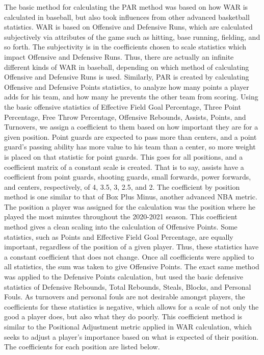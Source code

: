 \documentclass[12pt]{article}
\begin{document}
The basic method for calculating the PAR method was based on how WAR is calculated in baseball, but 
also took influences from other advanced basketball statistics. WAR is based on Offensive and Defensive 
Runs, which are calculated subjectively via attributes of the game such as hitting, base running, fielding, 
and so forth. The subjectivity is in the coefficients chosen to scale statistics which impact Offensive and 
Defensive Runs. Thus, there are actually an infinite different kinds of WAR in baseball, depending on which 
method of calculating Offensive and Defensive Runs is used. Similarly, PAR is created by calculating 
Offensive and Defensive Points statistics, to analyze how many points a player adds for his team, and how 
many he prevents the other team from scoring. Using the basic offensive statistics of Effective Field Goal 
Percentage, Three Point Percentage, Free Throw Percentage, Offensive Rebounds, Assists, Points, and 
Turnovers, we assign a coefficient to them based on how important they are for a given position. Point 
guards are expected to pass more than centers, and a point guard's passing ability has more value to his 
team than a center, so more weight is placed on that statistic for point guards. This goes for all positions, 
and a coefficient matrix of a constant scale is created. That is to say, assists have a coefficient from point 
guards, shooting guards, small forwards, power forwards, and centers, respectively, of 4, 3.5, 3, 2.5, and 2. 
The coefficient by position method is one similar to that of Box Plus Minus, another advanced NBA metric. 
The position a player was assigned for the calculation was the position where he played the most minutes 
throughout the 2020-2021 season. This coefficient method gives a clean scaling into the calculation of 
Offensive Points. Some statistics, such as Points and Effective Field Goal Percentage, are equally 
important, regardless of the position of a given player. Thus, these statistics have a constant coefficient that 
does not change. Once all coefficients were applied to all statistics, the sum was taken to give Offensive 
Points. The exact same method was applied to the Defensive Points calculation, but used the basic 
defensive statistics of Defensive Rebounds, Total Rebounds, Steals, Blocks, and Personal Fouls. As 
turnovers and personal fouls are not desirable amongst players, the coefficients for these statistics is 
negative, which allows for a scale of not only the good a player does, but also what they do poorly. This 
coefficient method is similar to the Positional Adjustment metric applied in WAR calculation, which seeks to 
adjust a player's importance based on what is expected of their position. The coefficients for each position are listed below.
\end{document}

